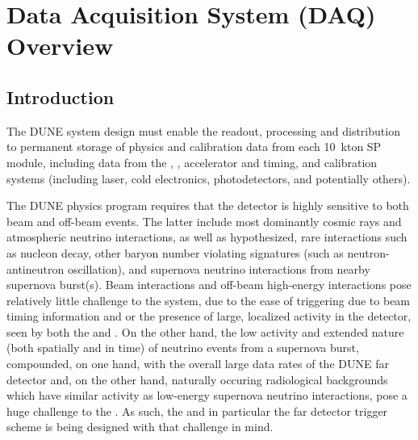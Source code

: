 \section{Data Acquisition System (DAQ) Overview}
\label{sec:fdsp-daq-ov}


\subsection{Introduction}
\label{sec:fdsp-daq-intro}

The DUNE    system
design must enable the readout, processing and distribution to
permanent storage of physics and calibration data from each 10~kton SP
module, including data from the , ,
accelerator and timing, and
calibration systems (including laser, cold electronics,
photodetectors, and potentially others).

The DUNE physics program requires that the detector is highly
sensitive to both beam and off-beam events. The latter include most
dominantly cosmic rays and atmospheric neutrino interactions, as well
as hypothesized, rare interactions such as nucleon decay, other baryon
number violating signatures (such as neutron-antineutron oscillation),
and supernova neutrino interactions from nearby supernova
burst(s). Beam interactions and off-beam high-energy interactions pose
relatively little challenge to the  system, due to the
ease of triggering due to beam timing information and\/ or the
presence of large, localized activity in the detector, seen by both
the  and . On the other hand, the low activity
and extended nature (both spatially and in time) of neutrino events
from a supernova burst, compounded, on one hand, with the overall large data rates 
of the DUNE far detector and, on the other hand, naturally occuring radiological backgrounds which
have similar activity as low-energy supernova neutrino interactions,
pose a huge challenge to the . As such, the  and
in particular the far detector trigger scheme is being designed with
that challenge in mind. 


